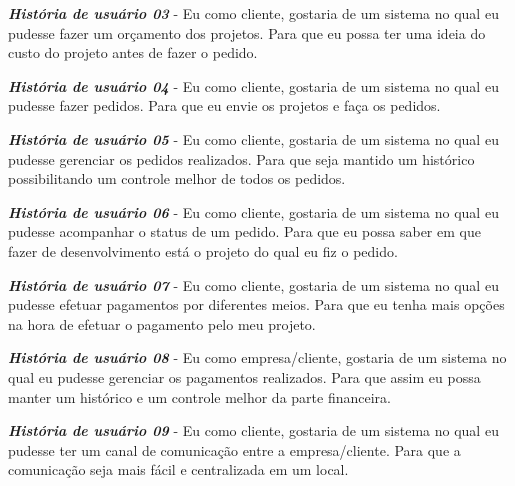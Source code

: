 \textbf{\textit{História de usuário 03}} - Eu como cliente, gostaria de um sistema no qual eu pudesse fazer um orçamento dos projetos. Para que eu possa ter uma ideia do custo do projeto antes de fazer o pedido.

\textbf{\textit{História de usuário 04}} - Eu como cliente, gostaria de um sistema no qual eu pudesse fazer pedidos. Para que eu envie os projetos e faça os pedidos.

\textbf{\textit{História de usuário 05}} - Eu como cliente, gostaria de um sistema no qual eu pudesse gerenciar os pedidos realizados. Para que seja mantido um histórico possibilitando um controle melhor de todos os pedidos.

\textbf{\textit{História de usuário 06}} - Eu como cliente, gostaria de um sistema no qual eu pudesse acompanhar o status de um pedido. Para que eu possa saber em que fazer de desenvolvimento está o projeto do qual eu fiz o pedido.

\textbf{\textit{História de usuário 07}} - Eu como cliente, gostaria de um sistema no qual eu pudesse efetuar pagamentos por diferentes meios. Para que eu tenha mais opções na hora de efetuar o pagamento pelo meu projeto.

\textbf{\textit{História de usuário 08}} - Eu como empresa/cliente, gostaria de um sistema no qual eu pudesse gerenciar os pagamentos realizados. Para que assim eu possa manter um histórico e um controle melhor da parte financeira.

\textbf{\textit{História de usuário 09}} - Eu como cliente, gostaria de um sistema no qual eu pudesse ter um canal de comunicação entre a empresa/cliente. Para que a comunicação seja mais fácil e centralizada em um local.